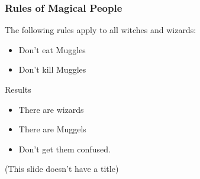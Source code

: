 \documentclass[aspectratio=169]{beamer}
\begin{document}
\begin{frame}
\frametitle{Rules of Magical People}

The following rules apply to all witches and wizards:
\begin{itemize}
\item Don't eat Muggles
\item Don't kill Muggles
\end{itemize}

\end{frame}

\begin{frame}[notitle]


\begin{block}{Results}
\begin{itemize}
  \item There are wizards
  \item There are Muggels
  \pause
  \item Don't get them confused.
\end{itemize}
\end{block}
{\small (This slide doesn't have a title)}

\end{frame}
 
\end{document}
